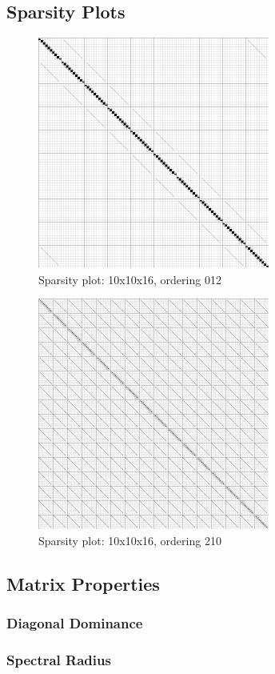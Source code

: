 \documentclass[10pt]{article}
\begin{document}
\begin{multicols}{2}
\subsection{Sparsity Plots}
\begin{figure}[H]
	\centering
	\includegraphics[width=3in]{../img/sparsity/int_kelp1_10x10x16_012.png}
	\caption{Sparsity plot: 10x10x16, ordering 012}
\end{figure}

\begin{figure}[H]
	\centering
	\includegraphics[width=3in]{../img/sparsity/int_kelp1_10x10x16_210.png}
	\caption{Sparsity plot: 10x10x16, ordering 210}
\end{figure}
\subsection{Matrix Properties}
\subsubsection{Diagonal Dominance}
\subsubsection{Spectral Radius}


\end{multicols}
\end{document}
